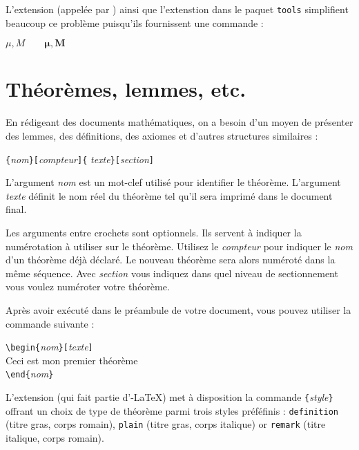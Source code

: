 L'extension  (appelée par ) ainsi que
l'extenstion  dans le paquet \texttt{tools} simplifient
beaucoup ce problème puisqu'ils fournissent une commande
 :

\begin{example}
$\mu, M \qquad
\boldsymbol{\mu}, \boldsymbol{M}$
\end{example}


\section{Théorèmes, lemmes, etc.}

En rédigeant des documents mathématiques, on a besoin d'un moyen de
présenter des lemmes, des définitions, des axiomes et d'autres
structures similaires :
\begin{lscommand}
\verb|{|\emph{nom}\verb|}[|\emph{compteur}\verb|]{|%
         \emph{texte}\verb|}[|\emph{section}\verb|]|
\end{lscommand}
L'argument \emph{nom} est un mot-clef utilisé pour identifier le
théorème. L'argument \emph{texte} définit le nom réel du théorème tel
qu'il sera imprimé dans le document final.

Les arguments entre crochets sont optionnels. Ils servent à
indiquer la numérotation à utiliser sur le théorème. Utilisez
le \emph{compteur} pour indiquer le \emph{nom} d'un théorème déjà
déclaré. Le nouveau théorème sera alors numéroté dans la même
séquence. Avec \emph{section} vous indiquez dans quel niveau de
sectionnement vous voulez numéroter votre théorème.

Après avoir exécuté  dans le préambule de votre
document, vous pouvez utiliser la commande suivante :

\begin{code}
\verb|\begin{|\emph{nom}\verb|}[|\emph{texte}\verb|]|\\
Ceci est mon premier théorème\\
\verb|\end{|\emph{nom}\verb|}|     
\end{code}

L'extension  (qui fait partie d'\AmS-LaTeX) met à
disposition la commande
\verb|{|\emph{style}\verb|}| offrant un choix de type de
théorème parmi trois styles
préféfinis : \texttt{definition} (titre gras, corps romain),
\texttt{plain} (titre gras, corps italique) or \texttt{remark} (titre
italique, corps romain).

